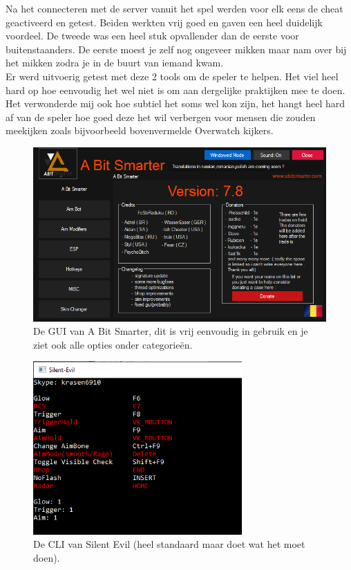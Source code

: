 \documentclass[pdftex,a4paper,12pt,twoside]{report}
\begin{document}
Na het connecteren met de server vanuit het spel werden voor elk eens de \gls{cheat} geactiveerd en getest. Beiden werkten vrij goed en gaven een heel duidelijk voordeel. De tweede was een heel stuk opvallender dan de eerste voor buitenstaanders. De eerste moest je zelf nog ongeveer mikken maar nam over bij het mikken zodra je in de buurt van iemand kwam.
\\

Er werd uitvoerig getest met deze 2 tools om de speler te helpen. Het viel heel hard op hoe eenvoudig het wel niet is om aan dergelijke praktijken mee te doen. Het verwonderde mij ook hoe subtiel het soms wel kon zijn, het hangt heel hard af van de speler hoe goed deze het wil verbergen voor mensen die zouden meekijken zoals bijvoorbeeld bovenvermelde Overwatch kijkers.

\begin{figure}
\centering
\includegraphics[width=12cm]{img/abitsmarter}
\caption{De GUI van A Bit Smarter, dit is vrij eenvoudig in gebruik en je ziet ook alle opties onder categorieën.}
\end{figure}
\begin{figure}
\centering
\includegraphics[width=8cm]{img/silentevil}
\caption{De CLI van Silent Evil (heel standaard maar doet wat het moet doen).}
\end{figure}
\end{document}
